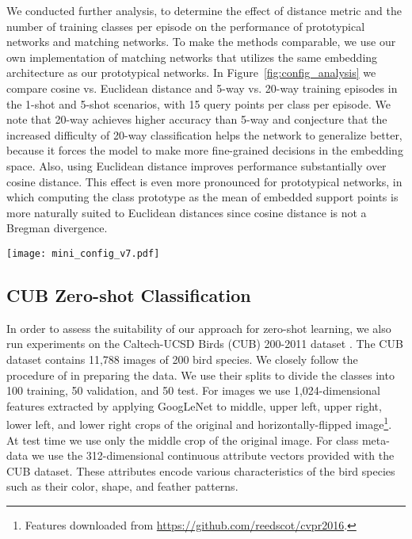 \documentclass{article}
\begin{document}
We conducted further analysis, to determine the effect of distance metric and the number of training classes per episode on the performance of prototypical networks and matching networks. To make the methods comparable, we use our own implementation of matching networks that utilizes the same embedding architecture as our prototypical networks. 
In Figure~\ref{fig:config_analysis} we compare cosine vs. Euclidean distance and 5-way vs. 20-way training episodes in the 1-shot and 5-shot scenarios, with 15 query points per class per episode. We note that 20-way achieves higher accuracy than 5-way and conjecture that the increased difficulty of 20-way classification helps the network to generalize better, because it forces the model to make more fine-grained decisions in the embedding space. Also, using Euclidean distance improves performance substantially over cosine distance. This effect is even more pronounced for prototypical networks, in which computing the class prototype as the mean of embedded support points is more naturally suited to Euclidean distances since cosine distance is not a Bregman divergence.

\begin{figure*}[bt]
    \centering
    \texttt{[image: mini\_config\_v7.pdf]}
    \caption{Comparison showing the effect of distance metric and number of classes per training episode on 5-way classification accuracy for both matching and prototypical networks on \emph{mini}ImageNet. The -axis indicates
    configuration of the training episodes (way, distance, and shot), and the -axis indicates 5-way test accuracy
    for the corresponding shot. Error bars indicate 95\% confidence intervals as computed over 600 test episodes. Note that matching networks and prototypical networks are identical in the 1-shot case.}
    \label{fig:config_analysis}
\end{figure*}

\subsection{CUB Zero-shot Classification}

In order to assess the suitability of our approach for zero-shot learning, we also run experiments on the Caltech-UCSD Birds (CUB) 200-2011 dataset \citep{welinder2010caltech}. The CUB dataset contains 11,788 images of 200 bird species. We closely follow the procedure of \citet{reed2016learning} in preparing the data. We use their splits to divide the classes into 100 training, 50 validation, and 50 test. For images we use 1,024-dimensional features extracted by applying GoogLeNet \citep{szegedy2015going} to middle, upper left, upper right, lower left, and lower right crops of the original and horizontally-flipped image\footnote{Features downloaded from \url{https://github.com/reedscot/cvpr2016}.}. At test time we use only the middle crop of the original image. For class meta-data we use the 312-dimensional continuous attribute vectors provided with the CUB dataset. These attributes encode various characteristics of the bird species such as their color, shape, and feather patterns.
\end{document}

